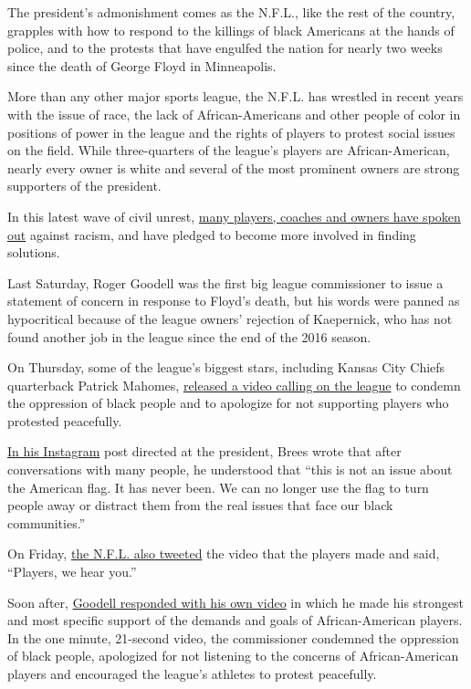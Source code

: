 The president's admonishment comes as the N.F.L., like the rest of the
country, grapples with how to respond to the killings of black Americans
at the hands of police, and to the protests that have engulfed the
nation for nearly two weeks since the death of George Floyd in
Minneapolis.

More than any other major sports league, the N.F.L. has wrestled in
recent years with the issue of race, the lack of African-Americans and
other people of color in positions of power in the league and the rights
of players to protest social issues on the field. While three-quarters
of the league's players are African-American, nearly every owner is
white and several of the most prominent owners are strong supporters of
the president.

In this latest wave of civil unrest,
\href{https://www.nytimes3xbfgragh.onion/2020/05/31/sports/football/colin-kaepernick-george-floyd.html}{many
players, coaches and owners have spoken out} against racism, and have
pledged to become more involved in finding solutions.

Last Saturday, Roger Goodell was the first big league commissioner to
issue a statement of concern in response to Floyd's death, but his words
were panned as hypocritical because of the league owners' rejection of
Kaepernick, who has not found another job in the league since the end of
the 2016 season.

On Thursday, some of the league's biggest stars, including Kansas City
Chiefs quarterback Patrick Mahomes,
\href{https://twitter.com/Cantguardmike/status/1268712743860928513}{released
a video calling on the league} to condemn the oppression of black people
and to apologize for not supporting players who protested peacefully.

\href{https://www.instagram.com/p/CBE4y_9Hj2S/?igshid=7ejunv7ktpcn}{In
his Instagram} post directed at the president, Brees wrote that after
conversations with many people, he understood that ``this is not an
issue about the American flag. It has never been. We can no longer use
the flag to turn people away or distract them from the real issues that
face our black communities.''

On Friday, \href{https://twitter.com/NFL/status/1269026096034398208}{the
N.F.L. also tweeted} the video that the players made and said,
``Players, we hear you.''

Soon after,
\href{https://twitter.com/NFL/status/1269034074552721408}{Goodell
responded with his own video} in which he made his strongest and most
specific support of the demands and goals of African-American players.
In the one minute, 21-second video, the commissioner condemned the
oppression of black people, apologized for not listening to the concerns
of African-American players and encouraged the league's athletes to
protest peacefully.

